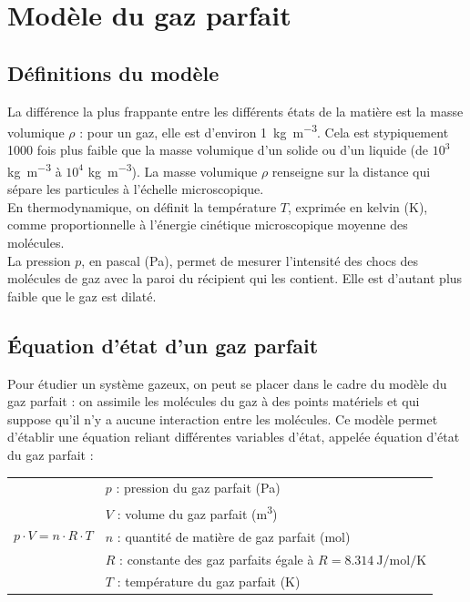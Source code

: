 \documentclass[a4paper,12pt,fleqn]{scrartcl}%
\begin{document}
	\maketitle
	\section{Modèle du gaz parfait}
	\subsection{Définitions du modèle}
	La différence la plus frappante entre les différents états de la matière est la masse volumique $\rho$ : pour un gaz, elle est d'environ \SI{1}{\kilo\gram\per\meter\cubed}. Cela est stypiquement 1000 fois plus faible que la masse volumique d'un solide ou d'un liquide (de $10^3$ \unit{\kilo\gram\per\meter\cubed} à $10^4$ \unit{\kilo\gram\per\meter\cubed}). La masse volumique $\rho$ renseigne sur la distance qui sépare les particules à l'échelle microscopique.\\
	En thermodynamique, on définit la température $T$, exprimée en kelvin (\unit{K}), comme proportionnelle à l'énergie cinétique microscopique moyenne des molécules.\\
	La pression $p$, en pascal (\unit{\pascal}), permet de mesurer l'intensité des chocs des molécules de gaz avec la paroi du récipient qui les contient. Elle est d'autant plus faible que le gaz est dilaté.
	\subsection{Équation d'état d'un gaz parfait}
	Pour étudier un système gazeux, on peut se placer dans le cadre du modèle du gaz parfait : on assimile les molécules du gaz à des points matériels et qui suppose qu'il n'y a aucune interaction entre les molécules. Ce modèle permet d'établir une équation reliant différentes variables d'état, appelée équation d'état du gaz parfait :
	\begin{center}
		\begin{tabular}{c|l}
	\multirow{5}{*}{$p \cdot V = n \cdot R \cdot T$} & $p$ : pression du gaz parfait (\unit{\pascal})\\
	& $V$ : volume du gaz parfait (\unit{\meter\cubed})\\
	& $n$ : quantité de matière de gaz parfait (\unit{\mole})\\
	& $R$ : constante des gaz parfaits égale à $R = \SI{8,314}{\joule\per\mole\per\kelvin}$\\
	& $T$ : température du gaz parfait (\unit{\kelvin})\\
		\end{tabular}
	\end{center}
\end{document}
